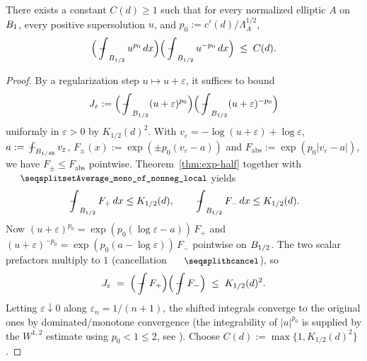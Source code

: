\begin{theorem}
\label{thm:crossover-exists}
\leanok
{}
There exists a constant $C(d) \geq 1$ such that for every normalized elliptic
$A$ on $B_{1}$, every positive supersolution $u$, and $p_0 := c'(d)/\Lambda_A^{1/2}$,
\begin{equation*}
  \Bigl(\fint_{\Bz{1/2}} u^{p_0}\,dx\Bigr)\Bigl(\fint_{\Bz{1/2}} u^{-p_0}\,dx\Bigr)
    \;\leq\; C(d).
\end{equation*}
\end{theorem}

\begin{proof}
\leanok
{}

By a regularization step $u \mapsto u + \varepsilon$, it suffices to bound
\begin{equation*}
  J_\varepsilon := \Bigl(\fint_{\Bz{1/2}}(u+\varepsilon)^{p_0}\Bigr)
        \Bigl(\fint_{\Bz{1/2}}(u+\varepsilon)^{-p_0}\Bigr)
\end{equation*}
uniformly in $\varepsilon > 0$ by $K_{1/2}(d)^2$. With $v_\varepsilon =
-\log(u+\varepsilon) + \log\varepsilon$, $a := \fint_{\Bz{1/48}} v_\varepsilon$,
$F_\pm(x) := \exp(\pm p_0(v_\varepsilon - a))$ and
$F_{\mathrm{abs}} := \exp(p_0|v_\varepsilon - a|)$, we have $F_\pm \leq
F_{\mathrm{abs}}$ pointwise. Theorem~\ref{thm:exp-half} together with
$\leanname{setAverage\_mono\_of\_nonneg\_local}$ yields
\begin{equation*}
  \fint_{\Bz{1/2}} F_+\,dx \leq K_{1/2}(d), \qquad
  \fint_{\Bz{1/2}} F_-\,dx \leq K_{1/2}(d).
\end{equation*}
Now $(u+\varepsilon)^{p_0} = \exp(p_0(\log\varepsilon - a))\,F_+$ and
$(u+\varepsilon)^{-p_0} = \exp(p_0(a - \log\varepsilon))\,F_-$ pointwise on
$B_{1/2}$. The two scalar prefactors multiply to $1$ (cancellation
$\leanname{hcancel}$), so
\begin{equation*}
  J_\varepsilon \;=\; \Bigl(\fint F_+\Bigr)\Bigl(\fint F_-\Bigr)
    \;\leq\; K_{1/2}(d)^2.
\end{equation*}
Letting $\varepsilon \downarrow 0$ along $\varepsilon_n = 1/(n+1)$, the
shifted integrals converge to the original ones by dominated/monotone
convergence (the integrability of $|u|^{p_0}$ is supplied by the
$W^{1,2}$ estimate using $p_0 < 1 \leq 2$, see
). Choose $C(d) := \max\{1, K_{1/2}(d)^2\}$.
\end{proof}

